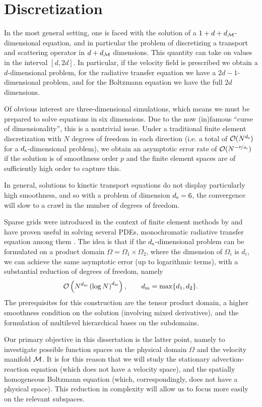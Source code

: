 \section{Discretization}

In the most general setting, one is faced with the solution of a $1+d+d_{\mathcal{M}}$-dimensional equation, and in
particular the problem of discretizing a transport and scattering operator in $d+d_{\mathcal{M}}$ dimensions. This
quantity can take on values in the interval $[d,2d]$. In particular, if the velocity field is prescribed we
obtain a $d$-dimensional problem, for the radiative transfer equation we have a $2d-1$-dimensional problem,
and for the Boltzmann equation we have the full $2d$ dimensions.

Of obvious interest are three-dimensional simulations, which means we must be prepared to solve equations in
six dimensions. Due to the now (in)famous ``curse of dimensionality'', this is a nontrivial issue.  Under a
traditional finite element discretization with $N$ degrees of freedom in each direction (i.e. a total of
$\mathcal{O}(N^{d_{\mathrm{s}}})$ for a $d_{\mathrm{s}}$-dimensional problem), we obtain an asymptotic error rate of
$\mathcal{O}(N^{-\nicefrac{p}{d_{\mathrm{s}}}})$ if the solution is of smoothness order $p$ and the finite element spaces are
of sufficiently high order to capture this.

In general, solutions to kinetic transport equations do not display particularly high smoothness, and so with
a problem of dimension $d_{\mathrm{s}}=6$, the convergence will slow to a crawl in the number of degrees of freedom.

Sparse grids were introduced in the context of finite element methods by \cite{Zenger91} and have proven
useful in solving several PDEs, monochromatic radiative transfer equation among them \cite{Widmer08}. The idea
is that if the $d_{\mathrm{s}}$-dimensional problem can be formulated on a product domain $\Omega = \Omega_1 \times
\Omega_2$, where the dimension of $\Omega_i$ is $d_i$, we can achieve the same asymptotic error (up to
logarithmic terms), with a substantial reduction of degrees of freedom, namely
\[
    \mathcal{O}\left(N^{d_{\mathrm{m}}} \left(\log N\right)^{d_{\mathrm{m}}} \right), \qquad d_{\mathrm{m}} = \max\{d_1,d_2\}.
\]
The prerequisites for this construction are the tensor product domain, a higher smoothness condition on the
solution (involving mixed derivatives), and the formulation of multilevel hierarchical bases on the subdomains.

Our primary objective in this dissertation is the latter point, namely to investigate possible function spaces
on the physical domain $\Omega$ and the velocity manifold $\mathcal{M}$. It is for this reason that we will study the
stationary advection-reaction equation (which does not have a velocity space), and the spatially homogeneous
Boltzmann equation (which, correspondingly, does not have a physical space). This reduction in complexity will
allow us to focus more easily on the relevant subspaces.

